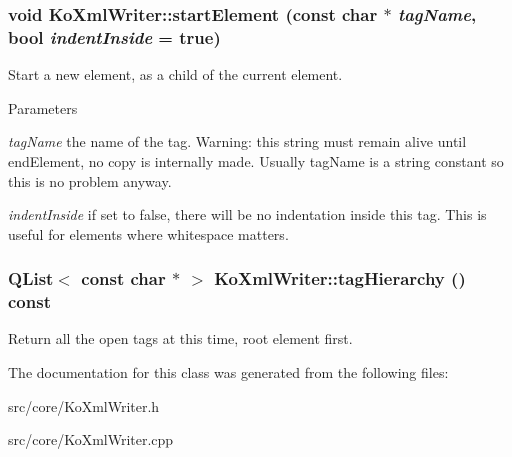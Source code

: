 \hypertarget{classKoXmlWriter_a38a32e955d59b3e321914320ec4f2aea}{
\subsubsection[{startElement}]{\setlength{\rightskip}{0pt plus 5cm}void KoXmlWriter::startElement (const char $\ast$ {\em tagName}, \/  bool {\em indentInside} = {\ttfamily true})}}
\label{classKoXmlWriter_a38a32e955d59b3e321914320ec4f2aea}
Start a new element, as a child of the current element. 
\begin{DoxyParams}{Parameters}
\item[{\em tagName}]the name of the tag. Warning: this string must remain alive until endElement, no copy is internally made. Usually tagName is a string constant so this is no problem anyway. \item[{\em indentInside}]if set to false, there will be no indentation inside this tag. This is useful for elements where whitespace matters. \end{DoxyParams}
\hypertarget{classKoXmlWriter_a9b3c63f244bbf41882ea76215b1be287}{
\subsubsection[{tagHierarchy}]{\setlength{\rightskip}{0pt plus 5cm}QList$<$ const char $\ast$ $>$ KoXmlWriter::tagHierarchy () const}}
\label{classKoXmlWriter_a9b3c63f244bbf41882ea76215b1be287}
Return all the open tags at this time, root element first. 

The documentation for this class was generated from the following files:\begin{DoxyCompactItemize}
\item 
src/core/KoXmlWriter.h\item 
src/core/KoXmlWriter.cpp\end{DoxyCompactItemize}
